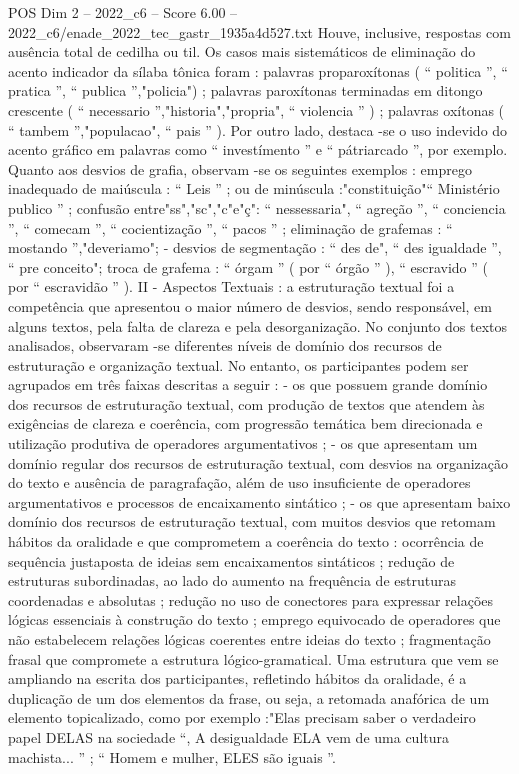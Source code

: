 \begin{textsample}{POS Dim 2 – 2022\_c6 – Score 6.00 – 2022\_c6/enade\_2022\_tec\_gastr\_1935a4d527.txt}
Houve, inclusive, respostas com ausência total de cedilha ou til.
Os casos mais sistemáticos de eliminação do acento indicador da sílaba tônica foram : palavras proparoxítonas ( “ politica ”, “ pratica ”, “ publica ”,"policia") ; palavras paroxítonas terminadas em ditongo crescente ( “ necessario ”,"historia","propria", “ violencia ” ) ; palavras oxítonas ( “ tambem ”,"populacao", “ pais ” ).
Por outro lado, destaca -se o uso indevido do acento gráfico em palavras como “ investímento ” e “ pátriarcado ”, por exemplo.
Quanto aos desvios de grafia, observam -se os seguintes exemplos : emprego inadequado de maiúscula : “ Leis ” ; ou de minúscula :"constituição"“ Ministério publico ” ; confusão entre"ss","sc","c"e"ç": “ nessessaria", “ agreção ”, “ conciencia ”, “ comecam ”, “ cocientização ”, “ pacos ” ; eliminação de grafemas : “ mostando ”,"deveriamo"; - desvios de segmentação : “ des de", “ des igualdade ”, “ pre conceito"; troca de grafema : “ órgam ” ( por “ órgão ” ), “ escravido ” ( por “ escravidão ” ).
II - Aspectos Textuais : a estruturação textual foi a competência que apresentou o maior número de desvios, sendo responsável, em alguns textos, pela falta de clareza e pela desorganização.
No conjunto dos textos analisados, observaram -se diferentes níveis de domínio dos recursos de estruturação e organização textual.
No entanto, os participantes podem ser agrupados em três faixas descritas a seguir : - os que possuem grande domínio dos recursos de estruturação textual, com produção de textos que atendem às exigências de clareza e coerência, com progressão temática bem direcionada e utilização produtiva de operadores argumentativos ; - os que apresentam um domínio regular dos recursos de estruturação textual, com desvios na organização do texto e ausência de paragrafação, além de uso insuficiente de operadores argumentativos e processos de encaixamento sintático ; - os que apresentam baixo domínio dos recursos de estruturação textual, com muitos desvios que retomam hábitos da oralidade e que comprometem a coerência do texto : ocorrência de sequência justaposta de ideias sem encaixamentos sintáticos ; redução de estruturas subordinadas, ao lado do aumento na frequência de estruturas coordenadas e absolutas ; redução no uso de conectores para expressar relações lógicas essenciais à construção do texto ; emprego equivocado de operadores que não estabelecem relações lógicas coerentes entre ideias do texto ; fragmentação frasal que compromete a estrutura lógico-gramatical.
Uma estrutura que vem se ampliando na escrita dos participantes, refletindo hábitos da oralidade, é a duplicação de um dos elementos da frase, ou seja, a retomada anafórica de um elemento topicalizado, como por exemplo :"Elas precisam saber o verdadeiro papel DELAS na sociedade “, A desigualdade ELA vem de uma cultura machista... ” ; “ Homem e mulher, ELES são iguais ”.

\end{textsample}
